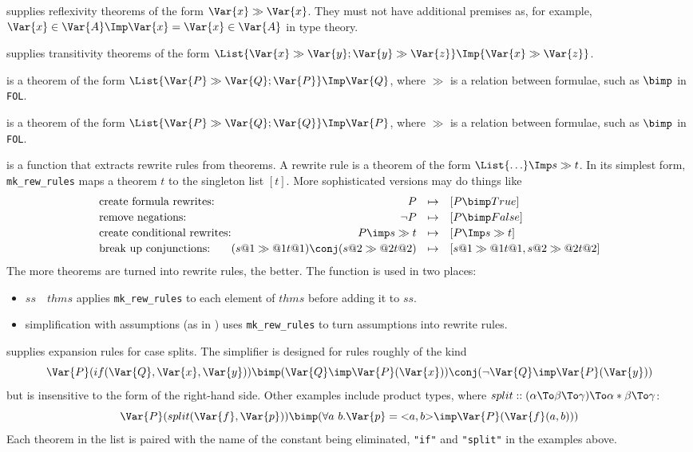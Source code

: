 \begin{ttdescription}
\item[\ttindexbold{refl_thms}] 
supplies reflexivity theorems of the form $\Var{x} \gg
\Var{x}$.  They must not have additional premises as, for example,
$\Var{x}\in\Var{A} \Imp \Var{x} = \Var{x}\in\Var{A}$ in type theory.

\item[\ttindexbold{trans_thms}] 
supplies transitivity theorems of the form
$\List{\Var{x}\gg\Var{y}; \Var{y}\gg\Var{z}} \Imp {\Var{x}\gg\Var{z}}$.

\item[\ttindexbold{red1}] 
is a theorem of the form $\List{\Var{P}\gg\Var{Q};
\Var{P}} \Imp \Var{Q}$, where $\gg$ is a relation between formulae, such as
$\bimp$ in {\tt FOL}.

\item[\ttindexbold{red2}] 
is a theorem of the form $\List{\Var{P}\gg\Var{Q};
\Var{Q}} \Imp \Var{P}$, where $\gg$ is a relation between formulae, such as
$\bimp$ in {\tt FOL}.

\item[\ttindexbold{mk_rew_rules}] 
is a function that extracts rewrite rules from theorems.  A rewrite rule is
a theorem of the form $\List{\ldots}\Imp s \gg t$.  In its simplest form,
{\tt mk_rew_rules} maps a theorem $t$ to the singleton list $[t]$.  More
sophisticated versions may do things like
\[
\begin{array}{l@{}r@{\quad\mapsto\quad}l}
\mbox{create formula rewrites:}& P & [P \bimp True] \\[.5ex]
\mbox{remove negations:}& \neg P & [P \bimp False] \\[.5ex]
\mbox{create conditional rewrites:}& P\imp s\gg t & [P\Imp s\gg t] \\[.5ex]
\mbox{break up conjunctions:}& 
        (s@1 \gg@1 t@1) \conj (s@2 \gg@2 t@2) & [s@1 \gg@1 t@1, s@2 \gg@2 t@2]
\end{array}
\]
The more theorems are turned into rewrite rules, the better.  The function
is used in two places:
\begin{itemize}
\item 
$ss$~~$thms$ applies {\tt mk_rew_rules} to each element of
$thms$ before adding it to $ss$.
\item 
simplification with assumptions (as in ) uses
{\tt mk_rew_rules} to turn assumptions into rewrite rules.
\end{itemize}

\item[\ttindexbold{case_splits}] 
supplies expansion rules for case splits.  The simplifier is designed
for rules roughly of the kind
\[ \Var{P}(if(\Var{Q},\Var{x},\Var{y})) \bimp (\Var{Q} \imp \Var{P}(\Var{x}))
\conj (\neg\Var{Q} \imp \Var{P}(\Var{y})) 
\] 
but is insensitive to the form of the right-hand side.  Other examples
include product types, where $split ::
(\alpha\To\beta\To\gamma)\To\alpha*\beta\To\gamma$:
\[ \Var{P}(split(\Var{f},\Var{p})) \bimp (\forall a~b. \Var{p} =
{<}a,b{>} \imp \Var{P}(\Var{f}(a,b))) 
\] 
Each theorem in the list is paired with the name of the constant being
eliminated, {\tt"if"} and {\tt"split"} in the examples above.


\end{ttdescription}
